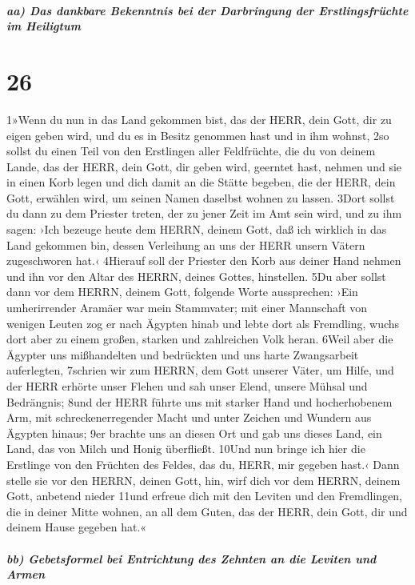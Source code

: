 \hypertarget{aa-das-dankbare-bekenntnis-bei-der-darbringung-der-erstlingsfruxfcchte-im-heiligtum}{%
\subparagraph{aa) Das dankbare Bekenntnis bei der Darbringung der
Erstlingsfrüchte im
Heiligtum}\label{aa-das-dankbare-bekenntnis-bei-der-darbringung-der-erstlingsfruxfcchte-im-heiligtum}}

\hypertarget{section-25}{%
\section{26}\label{section-25}}

1»Wenn du nun in das Land gekommen bist, das der HERR, dein Gott, dir zu
eigen geben wird, und du es in Besitz genommen hast und in ihm wohnst,
2so sollst du einen Teil von den Erstlingen aller Feldfrüchte, die du
von deinem Lande, das der HERR, dein Gott, dir geben wird, geerntet
hast, nehmen und sie in einen Korb legen und dich damit an die Stätte
begeben, die der HERR, dein Gott, erwählen wird, um seinen Namen
daselbst wohnen zu lassen. 3Dort sollst du dann zu dem Priester treten,
der zu jener Zeit im Amt sein wird, und zu ihm sagen: ›Ich bezeuge heute
dem HERRN, deinem Gott, daß ich wirklich in das Land gekommen bin,
dessen Verleihung an uns der HERR unsern Vätern zugeschworen hat.‹
4Hierauf soll der Priester den Korb aus deiner Hand nehmen und ihn vor
den Altar des HERRN, deines Gottes, hinstellen. 5Du aber sollst dann vor
dem HERRN, deinem Gott, folgende Worte aussprechen: ›Ein umherirrender
Aramäer war mein Stammvater; mit einer Mannschaft von wenigen Leuten zog
er nach Ägypten hinab und lebte dort als Fremdling, wuchs dort aber zu
einem großen, starken und zahlreichen Volk heran. 6Weil aber die Ägypter
uns mißhandelten und bedrückten und uns harte Zwangsarbeit auferlegten,
7schrien wir zum HERRN, dem Gott unserer Väter, um Hilfe, und der HERR
erhörte unser Flehen und sah unser Elend, unsere Mühsal und Bedrängnis;
8und der HERR führte uns mit starker Hand und hocherhobenem Arm, mit
schreckenerregender Macht und unter Zeichen und Wundern aus Ägypten
hinaus; 9er brachte uns an diesen Ort und gab uns dieses Land, ein Land,
das von Milch und Honig überfließt. 10Und nun bringe ich hier die
Erstlinge von den Früchten des Feldes, das du, HERR, mir gegeben hast.‹
Dann stelle sie vor den HERRN, deinen Gott, hin, wirf dich vor dem
HERRN, deinem Gott, anbetend nieder 11und erfreue dich mit den Leviten
und den Fremdlingen, die in deiner Mitte wohnen, an all dem Guten, das
der HERR, dein Gott, dir und deinem Hause gegeben hat.«

\hypertarget{bb-gebetsformel-bei-entrichtung-des-zehnten-an-die-leviten-und-armen}{%
\subparagraph{bb) Gebetsformel bei Entrichtung des Zehnten an die
Leviten und
Armen}\label{bb-gebetsformel-bei-entrichtung-des-zehnten-an-die-leviten-und-armen}}

